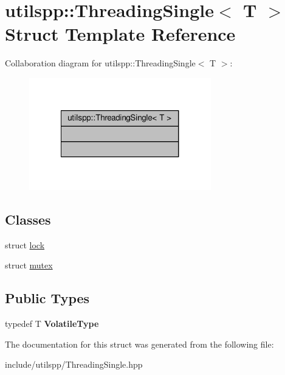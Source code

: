 \hypertarget{structutilspp_1_1ThreadingSingle}{\section{utilspp\-:\-:Threading\-Single$<$ T $>$ Struct Template Reference}
\label{structutilspp_1_1ThreadingSingle}
}


Collaboration diagram for utilspp\-:\-:Threading\-Single$<$ T $>$\-:
\nopagebreak
\begin{figure}[H]
\begin{center}
\leavevmode
\includegraphics[width=224pt]{structutilspp_1_1ThreadingSingle__coll__graph}
\end{center}
\end{figure}
\subsection*{Classes}
\begin{DoxyCompactItemize}
\item 
struct \hyperlink{structutilspp_1_1ThreadingSingle_1_1lock}{lock}
\item 
struct \hyperlink{structutilspp_1_1ThreadingSingle_1_1mutex}{mutex}
\end{DoxyCompactItemize}
\subsection*{Public Types}
\begin{DoxyCompactItemize}
\item 
\hypertarget{structutilspp_1_1ThreadingSingle_a291a5312fb48ca55f8641b8aad31945c}{typedef T {\bfseries Volatile\-Type}}\label{structutilspp_1_1ThreadingSingle_a291a5312fb48ca55f8641b8aad31945c}

\end{DoxyCompactItemize}


The documentation for this struct was generated from the following file\-:\begin{DoxyCompactItemize}
\item 
include/utilspp/Threading\-Single.\-hpp\end{DoxyCompactItemize}
